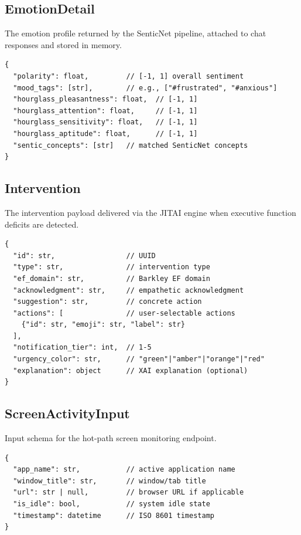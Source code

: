 \subsection{EmotionDetail}

The emotion profile returned by the SenticNet pipeline, attached to chat responses and stored in memory.

\begin{lstlisting}
{
  "polarity": float,         // [-1, 1] overall sentiment
  "mood_tags": [str],        // e.g., ["#frustrated", "#anxious"]
  "hourglass_pleasantness": float,  // [-1, 1]
  "hourglass_attention": float,     // [-1, 1]
  "hourglass_sensitivity": float,   // [-1, 1]
  "hourglass_aptitude": float,      // [-1, 1]
  "sentic_concepts": [str]   // matched SenticNet concepts
}
\end{lstlisting}

\subsection{Intervention}

The intervention payload delivered via the JITAI engine when executive function deficits are detected.

\begin{lstlisting}
{
  "id": str,                 // UUID
  "type": str,               // intervention type
  "ef_domain": str,          // Barkley EF domain
  "acknowledgment": str,     // empathetic acknowledgment
  "suggestion": str,         // concrete action
  "actions": [               // user-selectable actions
    {"id": str, "emoji": str, "label": str}
  ],
  "notification_tier": int,  // 1-5
  "urgency_color": str,      // "green"|"amber"|"orange"|"red"
  "explanation": object      // XAI explanation (optional)
}
\end{lstlisting}

\subsection{ScreenActivityInput}

Input schema for the hot-path screen monitoring endpoint.

\begin{lstlisting}
{
  "app_name": str,           // active application name
  "window_title": str,       // window/tab title
  "url": str | null,         // browser URL if applicable
  "is_idle": bool,           // system idle state
  "timestamp": datetime      // ISO 8601 timestamp
}
\end{lstlisting}
